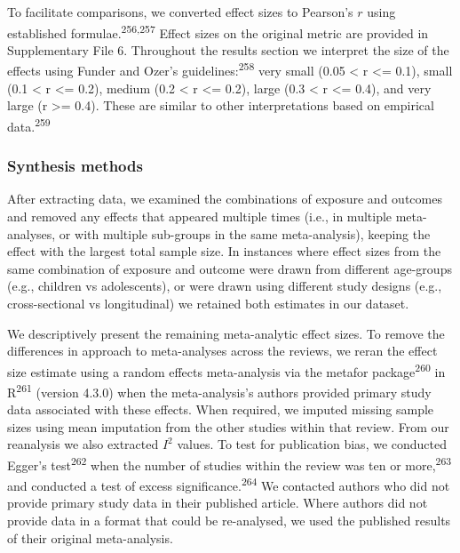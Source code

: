 \documentclass[
  english,
  man]{apa6}
\begin{document}
To facilitate comparisons, we converted effect sizes to Pearson's \(r\) using established formulae.\textsuperscript{256,257}
Effect sizes on the original metric are provided in Supplementary File 6.
Throughout the results section we interpret the size of the effects using Funder and Ozer's guidelines:\textsuperscript{258} very small (0.05 \textless{} r \textless= 0.1), small (0.1 \textless{} r \textless= 0.2), medium (0.2 \textless{} r \textless= 0.2), large (0.3 \textless{} r \textless= 0.4), and very large (r \textgreater= 0.4).
These are similar to other interpretations based on empirical data.\textsuperscript{259}

\hypertarget{synthesis-methods}{%
\subsubsection{Synthesis methods}\label{synthesis-methods}}

After extracting data, we examined the combinations of exposure and outcomes and removed any effects that appeared multiple times (i.e., in multiple meta-analyses, or with multiple sub-groups in the same meta-analysis), keeping the effect with the largest total sample size.
In instances where effect sizes from the same combination of exposure and outcome were drawn from different age-groups (e.g., children vs adolescents), or were drawn using different study designs (e.g., cross-sectional vs longitudinal) we retained both estimates in our dataset.

We descriptively present the remaining meta-analytic effect sizes.
To remove the differences in approach to meta-analyses across the reviews, we reran the effect size estimate using a random effects meta-analysis via the metafor package\textsuperscript{260} in R\textsuperscript{261} (version 4.3.0) when the meta-analysis's authors provided primary study data associated with these effects.
When required, we imputed missing sample sizes using mean imputation from the other studies within that review.
From our reanalysis we also extracted \(I^2\) values.
To test for publication bias, we conducted Egger's test\textsuperscript{262} when the number of studies within the review was ten or more,\textsuperscript{263} and conducted a test of excess significance.\textsuperscript{264}
We contacted authors who did not provide primary study data in their published article.
Where authors did not provide data in a format that could be re-analysed, we used the published results of their original meta-analysis.
\end{document}
